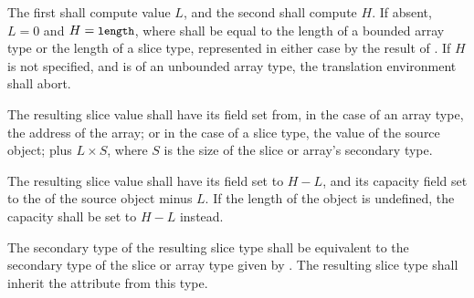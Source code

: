\specsubsubitem
The first  shall compute value $L$, and the second shall
compute $H$. If absent, $L = 0$ and $H = \mbox{\textup{\small\texttt{length}}}$, where 
shall be equal to the length of a bounded array type or the length of a slice
type, represented in either case by the result of
. If $H$ is not specified, and
 is of an unbounded array type, the translation
environment shall abort.

\specsubsubitem
The resulting slice value shall have its  field set from, in the case
of an array type, the address of the array; or in the case of a slice type, the
 value of the source object; plus $L \times S$, where $S$ is the
size of the slice or array's secondary type.

\specsubsubitem
The resulting slice value shall have its  field set to $H - L$,
and its capacity field set to the  of the source object minus $L$.
If the length of the object is undefined, the capacity shall be set to $H - L$
instead.

\specsubsubitem
The secondary type of the resulting slice type shall be equivalent to the
secondary type of the slice or array type given by
. The resulting slice type shall inherit the
 attribute from this type.


\begin{grammar}
 \\
	  \terminal{(}  \terminal{,}  \terminal{)} \\
	  \terminal{(}  \terminal{)} \\
	  \terminal{(}  \terminal{)} \\
	  \terminal{(}  \terminal{,}  \terminal{)} \\

 \\
	 \\
	\terminal{*}  \\

 \\
	 \optional{\terminal{,}} \\
	  \optional{\terminal{,}} \\
	 \terminal{,}  \\
\end{grammar}

